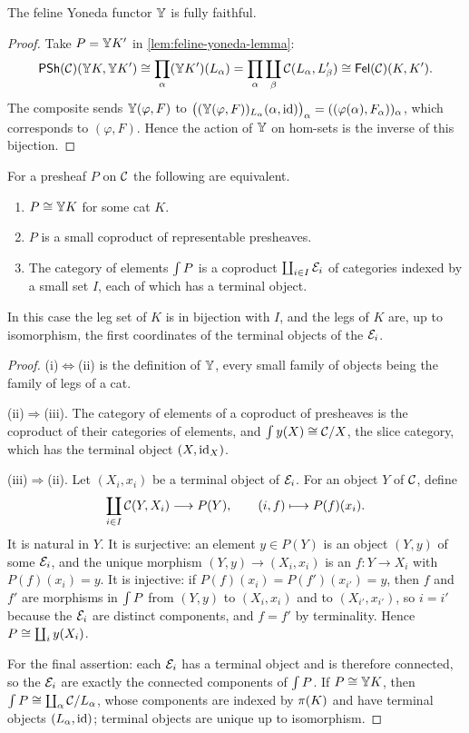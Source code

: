 \begin{theorem}\label{thm:yoneda-ff}
The feline Yoneda functor $\mathbb{Y}$ is fully faithful.
\end{theorem}

\begin{proof}
Take $P=\mathbb{Y} K'$ in \cref{lem:feline-yoneda-lemma}:
\[
\mathsf{PSh}(\mathcal{C})(\mathbb{Y} K,\mathbb{Y} K')\cong\prod_{\alpha}(\mathbb{Y} K')(L_\alpha)=\prod_\alpha\coprod_\beta\mathcal{C}(L_\alpha,L'_\beta)\cong\mathsf{Fel}(\mathcal{C})(K,K').
\]
The composite sends $\mathbb{Y}(\varphi,F)$ to
$\bigl((\mathbb{Y}(\varphi,F))_{L_\alpha}(\alpha,\mathrm{id})\bigr)_\alpha=((\varphi(\alpha),F_\alpha))_\alpha$,
which corresponds to $(\varphi,F)$. Hence the action of $\mathbb{Y}$ on hom-sets is
the inverse of this bijection.
\end{proof}

\begin{theorem}\label{thm:yoneda-image}
For a presheaf $P$ on $\mathcal{C}$ the following are equivalent.
\begin{enumerate}
\item $P\cong\mathbb{Y} K$ for some cat $K$.
\item $P$ is a small coproduct of representable presheaves.
\item The category of elements $\textstyle\int P$ is a coproduct $\coprod_{i\in I}\mathcal{E}_i$ of
  categories indexed by a small set $I$, each of which has a terminal object.
\end{enumerate}
In this case the leg set of $K$ is in bijection with $I$, and the legs of $K$
are, up to isomorphism, the first coordinates of the terminal objects of the
$\mathcal{E}_i$.
\end{theorem}

\begin{proof}
(i)$\Leftrightarrow$(ii) is the definition of $\mathbb{Y}$, every small family of
objects being the family of legs of a cat.

(ii)$\Rightarrow$(iii). The category of elements of a coproduct of presheaves
is the coproduct of their categories of elements, and $\textstyle\int y(X)\cong\mathcal{C}/X$, the
slice category, which has the terminal object $(X,\mathrm{id}_X)$.

(iii)$\Rightarrow$(ii). Let $(X_i,x_i)$ be a terminal object of $\mathcal{E}_i$. For an
object $Y$ of $\mathcal{C}$, define
\[
\coprod_{i\in I}\mathcal{C}(Y,X_i)\longrightarrow P(Y),\qquad (i,f)\longmapsto P(f)(x_i).
\]
It is natural in $Y$. It is surjective: an element $y\in P(Y)$ is an object
$(Y,y)$ of some $\mathcal{E}_i$, and the unique morphism $(Y,y)\to(X_i,x_i)$ is an
$f\colon Y\to X_i$ with $P(f)(x_i)=y$. It is injective: if
$P(f)(x_i)=P(f')(x_{i'})=y$, then $f$ and $f'$ are morphisms in $\textstyle\int P$ from
$(Y,y)$ to $(X_i,x_i)$ and to $(X_{i'},x_{i'})$, so $i=i'$ because the
$\mathcal{E}_i$ are distinct components, and $f=f'$ by terminality. Hence
$P\cong\coprod_iy(X_i)$.

For the final assertion: each $\mathcal{E}_i$ has a terminal object and is therefore
connected, so the $\mathcal{E}_i$ are exactly the connected components of $\textstyle\int P$. If
$P\cong\mathbb{Y} K$, then $\textstyle\int P\cong\coprod_\alpha\mathcal{C}/L_\alpha$, whose components are
indexed by $\pi(K)$ and have terminal objects $(L_\alpha,\mathrm{id})$; terminal objects
are unique up to isomorphism.
\end{proof}

